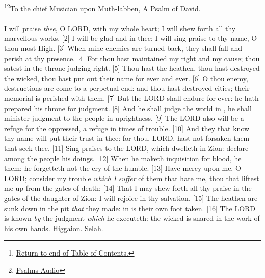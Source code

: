 \footnote{\textcolor[cmyk]{0.99998,1,0,0}{\hyperlink{TOC}{Return to end of Table of Contents.}}}\footnote{\href{https://audiobible.com/bible/bible.html}{\textcolor[cmyk]{0.99998,1,0,0}{Psalms Audio}}}\textcolor[cmyk]{0.99998,1,0,0}{To the chief Musician upon Muth-labben, A Psalm of David.}\\
\\
\textcolor[cmyk]{0.99998,1,0,0}{I will praise \emph{thee}, O LORD, with my whole heart; I will shew forth all thy marvellous works.}
[2] \textcolor[cmyk]{0.99998,1,0,0}{I will be glad and  in thee: I will sing praise to thy name, O thou most High.}
[3] \textcolor[cmyk]{0.99998,1,0,0}{When mine enemies are turned back, they shall fall and perish at thy presence.}
[4] \textcolor[cmyk]{0.99998,1,0,0}{For thou hast maintained my right and my cause; thou satest in the throne judging right.}
[5] \textcolor[cmyk]{0.99998,1,0,0}{Thou hast  the heathen, thou hast destroyed the wicked, thou hast put out their name for ever and ever.}
[6] \textcolor[cmyk]{0.99998,1,0,0}{O thou enemy, destructions are come to a perpetual end: and thou hast destroyed cities; their memorial is perished with them.}
[7] \textcolor[cmyk]{0.99998,1,0,0}{But the LORD shall endure for ever: he hath prepared his throne for judgment.}
[8] \textcolor[cmyk]{0.99998,1,0,0}{And he shall judge the world in , he shall minister judgment to the people in uprightness.}
[9] \textcolor[cmyk]{0.99998,1,0,0}{The LORD also will be a refuge for the oppressed, a refuge in times of trouble.}
[10] \textcolor[cmyk]{0.99998,1,0,0}{And they that know thy name will put their trust in thee: for thou, LORD, hast not forsaken them that seek thee.}
[11] \textcolor[cmyk]{0.99998,1,0,0}{Sing praises to the LORD, which dwelleth in Zion: declare among the people his doings.}
[12] \textcolor[cmyk]{0.99998,1,0,0}{When he maketh inquisition for blood, he  them: he forgetteth not the cry of the humble.}
[13] \textcolor[cmyk]{0.99998,1,0,0}{Have mercy upon me, O LORD; consider my trouble \emph{which} \emph{I} \emph{suffer} of them that hate me, thou that liftest me up from the gates of death:}
[14] \textcolor[cmyk]{0.99998,1,0,0}{That I may shew forth all thy praise in the gates of the daughter of Zion: I will rejoice in thy salvation.}
[15] \textcolor[cmyk]{0.99998,1,0,0}{The heathen are sunk down in the pit \emph{that} they made: in  is their own foot taken.}
[16] \textcolor[cmyk]{0.99998,1,0,0}{The LORD is known \emph{by} the judgment \emph{which} he executeth: the wicked is snared in the work of his own hands. Higgaion. Selah.}
